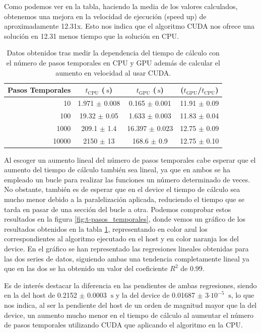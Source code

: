 \documentclass[11pt,a4paper,twoside,pdf]{article}
\numberwithin{equation}{section}
\begin{document}
Como podemos ver en la tabla, haciendo la media de los valores calculados, obtenemos una mejora en la velocidad de ejecución (speed up) de aproximadamente 12.31x. Esto nos indica que el algoritmo CUDA nos ofrece una solución en 12.31 menos tiempo que la solución en CPU.

\begin{table}[h]
    \centering
    \begin{tabular}{|r|c|c|c|}
    \hline
    Pasos Temporales &  $t_\text{CPU}$ ($\SI{}{\second}$)  & $t_\text{GPU}$ ($\SI{}{\second}$) &  ($t_\text{GPU}$/$t_\text{CPU}$)  \\ \hline \hline
     10 & 1.971 $\pm$ 0.008 & 0.165 $\pm$ 0.001 & 11.91 $\pm$ 0.09\\ \hline
     100 & 19.32 $\pm$ 0.05 & 1.633 $\pm$ 0.003 & 11.83 $\pm$ 0.04\\ \hline
     1000 & 209.1 $\pm$ 1.4 & 16.397 $\pm$ 0.023 & 12.75 $\pm$ 0.09\\ \hline
     10000 & 2150 $\pm$ 13 & 168.6 $\pm$ 0.9 & 12.75 $\pm$ 0.10\\ \hline
    \end{tabular}
    \caption{Datos obtenidos tras medir la dependencia del tiempo de cálculo con el número de pasos temporales en CPU y GPU además de calcular el aumento en velocidad al usar CUDA.}
    \label{tab:npasos}
\end{table}


Al escoger un aumento lineal del número de pasos temporales cabe esperar que el aumento del tiempo de cálculo también sea lineal, ya que en ambos se ha empleado un bucle para realizar las funciones un número determinado de veces. No obstante, también es de esperar que en el device el tiempo de cálculo sea mucho menor debido a la paralelización aplicada, reduciendo el tiempo que se tarda en pasar de una sección del bucle a otra. Podemos comprobar estos resultados en la figura \ref{fig:t-pasos_temporales}, donde vemos un gráfico de los resultados obtenidos en la tabla \ref{tab:npasos}, representando en color azul los correspondientes al algoritmo ejecutado en el host y en color naranja los del device. En el gráfico se han representado las regresiones lineales obtenidas para las dos series de datos, siguiendo ambas una tendencia completamente lineal ya que en las dos se ha obtenido un valor del coeficiente $R^2$ de 0.99.

Es de interés destacar la diferencia en las pendientes de ambas regresiones, siendo en la del host de 0.2152 $\pm$ 0.0003 $\SI{}{\second}$ y la del device de 0.01687 $\pm$ 3$\cdot 10^{-5}$ $\SI{}{\second}$, lo que nos indica, al ser la pendiente del host de un orden de magnitud mayor que la del device, un aumento mucho menor en el tiempo de cálculo al aumentar el número de pasos temporales utilizando CUDA que aplicando el algoritmo en la CPU.
\end{document}
